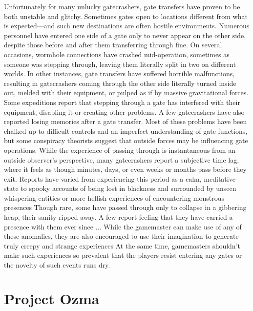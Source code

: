 Unfortunately for many unlucky gatecrashers, gate transfers have proven to be both unstable and glitchy. Sometimes gates open to locations different from what is expected—and such new destinations are often hostile environments. Numerous personnel have entered one side of a gate only to never appear on the other side, despite those before and after them transferring through fine. On several occasions, wormhole connections have crashed mid-operation, sometimes as someone was stepping through, leaving them literally split in two on different worlds. In other instances, gate transfers have suffered horrible malfunctions, resulting in gatecrashers coming through the other side literally turned inside out, melded with their equipment, or pulped as if by massive gravitational forces. Some expeditions report that stepping through a gate has interfered with their equipment, disabling it or creating other problems. A few gatecrashers have also reported losing memories after a gate transfer. Most of these problems have been chalked up to difficult controls and an imperfect understanding of gate functions, but some conspiracy theorists suggest that outside forces may be influencing gate operations. While the experience of passing through is instantaneous from an outside observer's perspective, many gatecrashers report a subjective time lag, where it feels as though minutes, days, or even weeks or months pass before they exit. Reports have varied from experiencing this period as a calm, meditative state to spooky accounts of being lost in blackness and surrounded by unseen whispering entities or more hellish experiences of encountering monstrous presences Though rare, some have passed through only to collapse in a gibbering heap, their sanity ripped away. A few report feeling that they have carried a presence with them ever since ... While the gamemaster can make use of any of these anomalies, they are also encouraged to use their imagination to generate truly creepy and strange experiences At the same time, gamemasters shouldn't make such experiences so prevalent that the players resist entering any gates or the novelty of such events runs dry. 

\section{Project Ozma} 

